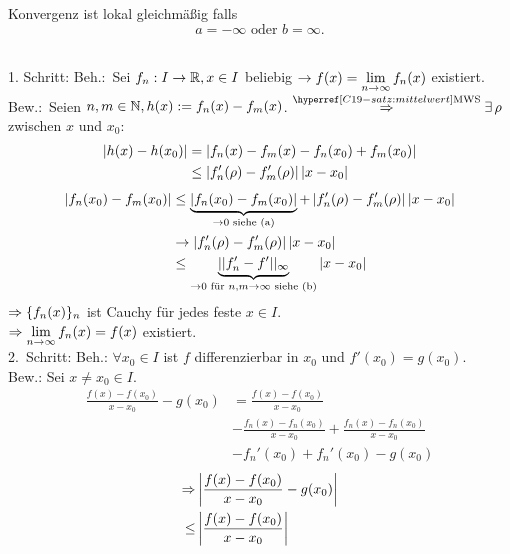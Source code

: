 \documentclass[../ana1.tex]{subfiles}
\begin{document}
\begin{bem}
    Konvergenz ist lokal gleichmäßig falls 
    \[ a = -\infty \text{ oder } b = \infty. \]
\end{bem}
\begin{bew}\hfill \\
    1. Schritt: Beh.:\ Sei \( f_n: I \rightarrow \mathbb{R}, x\in I \) 
    beliebig \( \rightarrow f(x) = \lim\limits_{n\rightarrow\infty} f_n(x) \) existiert. \\
    Bew.:\ Seien \( n,m \in \mathbb{N}, h(x) := f_n(x) - f_m(x) \).
    \( \overref{C19-satz:mittelwert}{MWS}{\Rightarrow} 
    \exists \, \rho \) zwischen \(x\) und \(x_0\):
    \begin{align*}
        \left| h(x) - h(x_0) \right| 
        &= \left| f_n(x) - f_m(x) - f_n(x_0) + f_m(x_0) \right| \\
        &\leq \left| f_n'(\rho) - f_m'(\rho) \right|\left|x-x_0\right|
    \end{align*}
    \begin{align*}
        \left| f_n(x_0) - f_m(x_0) \right|
        &\leq 
        \underbrace{\left| f_n(x_0) - f_m(x_0) \right|}_{\rightarrow 0 \text{ siehe (a)}} 
        + \left| f_n'(\rho) 
        - f_m'(\rho) \right|\left|x-x_0\right| \\
        &\rightarrow \left| f_n'(\rho) - f_m'(\rho) \right| \left|x-x_0\right| \\
        &\leq \underbrace{||f_n' - f'||_\infty}_{\rightarrow 0 
        \text{ für } n,m \rightarrow \infty \text{ siehe (b)}} 
        \left|x-x_0\right|        
    \end{align*}
    \( \Rightarrow \{f_n(x)\}_n \) ist Cauchy für jedes feste 
    \( x\in I \). \\
    \( \Rightarrow \lim\limits_{n\rightarrow\infty} f_n(x) = f(x) \) existiert. \\
    2.\ Schritt: Beh.: \( \forall x_0 \in I \) ist \( f \) 
    differenzierbar in \(x_0\) und \( f'(x_0) = g(x_0) \). \\
    Bew.: Sei \(x \neq x_0 \in I\).
    \begin{align*}
        \frac{f(x) - f(x_0)}{x-x_0} - g(x_0)
        &= \frac{ f(x) - f(x_0) }{ x-x_0 } \\
        &- \frac{ f_n(x) - f_n(x_0) }{ x-x_0 } 
        + \frac{ f_n(x) - f_n(x_0) }{ x-x_0 } \\
        &- f_n'(x_0) + f_n'(x_0) - g(x_0)
    \end{align*}
    \begin{align*}
        \Rightarrow &\left| \frac{f(x)-f(x_0)}{x-x_0} 
        - g(x_0) \right| \\
        \leq &\left| \frac{f(x)-f(x_0)}{x-x_0} 
\right|
\end{align*}
\end{bew}
\end{document}
